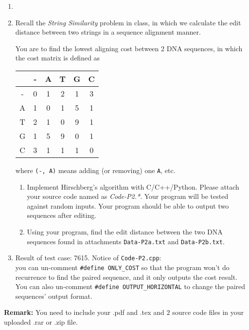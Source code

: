 \documentclass[12pt,a4paper]{article}
\makeatletter
\newtheorem*{solution}{Solution}
\theoremstyle{definition}
\renewenvironment{solution}[1][Solution] {\par\pushQED{\qed}\normalfont\topsep6\p@\@plus6\p@\relax\trivlist\item[\hskip\labelsep\bfseries#1\@addpunct{.}]\ignorespaces}{\popQED\endtrivlist\@endpefalse} \makeatother
\makeatother
\begin{document}
\begin{enumerate}
\begin{solution}
\begin{minipage}[t]{0.89\textwidth}
\begin{algorithm}[H]
        		\;
        		
        	\end{algorithm}
        \end{minipage}
    
    \end{solution}

    \item
    Recall the \emph{String Similarity} problem in class, in which we calculate the edit distance between two strings in a sequence alignment manner.

    You are to find the lowest aligning cost between 2 DNA sequences, in which the cost matrix is defined as

    \begin{center}
        \begin{tabular}{|c||c|c|c|c|c|}
        \hline
          & - & A & T & G & C \\
        \hline
        - & 0 & 1 & 2 & 1 & 3 \\
        A & 1 & 0 & 1 & 5 & 1 \\
        T & 2 & 1 & 0 & 9 & 1 \\
        G & 1 & 5 & 9 & 0 & 1 \\
        C & 3 & 1 & 1 & 1 & 0 \\
        \hline
        \end{tabular}
    \end{center}

    where \texttt{(-, A)} means adding (or removing) one \texttt{A}, etc.

    \begin{enumerate}
        \item
        Implement Hirschberg's algorithm with C/C++/Python. Please attach your source code named as {\color{red}\emph{Code-P2.*}}. Your program will be tested against random inputs. Your program should be able to output two sequences after editing.

        \item
        Using your program, find the edit distance between the two DNA sequences found in attachments \texttt{Data-P2a.txt} and \texttt{Data-P2b.txt}.
    \end{enumerate}
    \begin{solution}
        Result of test case: 7615.
    \end{solution}
	Notice of \texttt{Code-P2.cpp}: \\
	you can un-comment \texttt{\#define ONLY\_COST} so that the program won't do recurrence to find the paired sequence, and it only outputs the cost result. You can also un-comment \texttt{\#define OUTPUT\_HORIZONTAL} to change the paired sequences' output format.
	
\end{enumerate}

\vspace{20pt}

\textbf{Remark:} You need to include your .pdf and .tex and {\color{red}\emph{$2$}} source code files in your uploaded .rar or .zip file.

\end{document}
